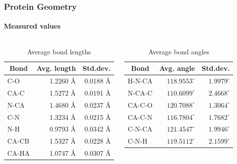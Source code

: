\documentclass{beamer}
\begin{document}
\begin{frame}[t, fragile]
  \frametitle{Protein Geometry}
  \framesubtitle{Measured values}

\vspace{-0.5cm}
  \begin{columns}
 \column{5.5cm}
\begin{table}
  \centering
  \begin{tabular}{lrr}
    \toprule
    \multicolumn{1}{c}{Bond} & \multicolumn{1}{c}{Avg. length} & \multicolumn{1}{c}{Std.dev.} \\ \midrule 
    C-O   & 1.2260 Å & 0.0188 Å\\
    CA-C  & 1.5272 Å & 0.0191 Å\\
    N-CA  & 1.4680 Å & 0.0237 Å\\
    C-N   & 1.3234 Å & 0.0215 Å\\
    N-H   & 0.9793 Å & 0.0342 Å\\
    CA-CB & 1.5327 Å & 0.0228 Å\\
    CA-HA & 1.0747 Å & 0.0307 Å\\ \bottomrule
  \end{tabular}
  \vspace{1mm}
  \caption{Average bond lengths}
  \label{tab:average_bond_lengths}
\end{table}

\column{5.5cm}
\begin{table}
  \centering
  \begin{tabular}{lrr}
    \toprule
    \multicolumn{1}{c}{Bond} & \multicolumn{1}{c}{Avg. angle} & \multicolumn{1}{c}{Std.dev.} \\ \midrule 
    H-N-CA & $118.9553^\circ$ & $1.9979^\circ$\\
    N-CA-C & $110.6099^\circ$ & $2.4668^\circ$\\
    CA-C-O & $120.7088^\circ$ & $1.3064^\circ$\\
    CA-C-N & $116.7804^\circ$ & $1.7682^\circ$\\
    C-N-CA & $121.4547^\circ$ & $1.9946^\circ$\\
    C-N-H  & $119.5112^\circ$ & $2.1599^\circ$\\ \bottomrule
  \end{tabular}
  \vspace{1mm}
  \caption{Average bond angles}
  \label{tab:average_bond_angles}
\end{table}

\end{columns}
\end{frame}
\end{document}
